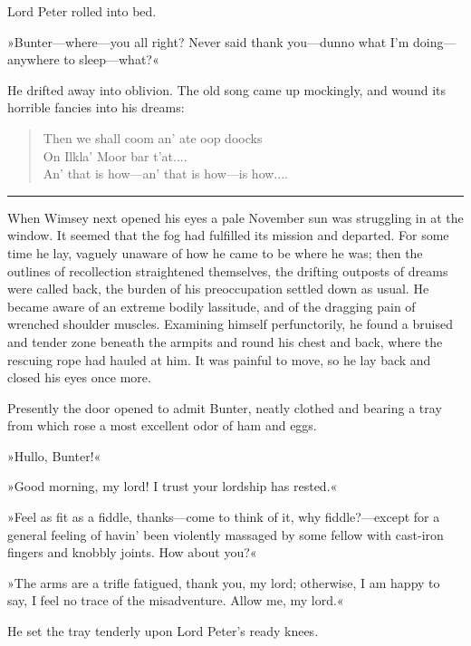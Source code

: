  Lord Peter rolled into bed.

»Bunter\allowbreak---\allowbreak where---you all right? Never said thank you\allowbreak---\allowbreak dunno what I'm doing\allowbreak---\allowbreak anywhere to sleep\allowbreak---\allowbreak what?«

He drifted away into oblivion. The old song came up mockingly, and wound its horrible fancies into his dreams: 

\begin{verse}
\begin{altverse}
Then we shall coom an' ate oop doocks\\
On Ilkla' Moor bar t'at....\\
An' that is how—an' that is how—is how....\\
\end{altverse}
\end{verse}

\noindent\hfil\rule{0.5\textwidth}{.4pt}\hfil 

When Wimsey next opened his eyes a pale November sun was struggling in at the window. It seemed that the fog had fulfilled its mission and departed. For some time he lay, vaguely unaware of how he came to be where he was; then the outlines of recollection straightened themselves, the drifting outposts of dreams were called back, the burden of his preoccupation settled down as usual. He became aware of an extreme bodily lassitude, and of the dragging pain of wrenched shoulder muscles. Examining himself perfunctorily, he found a bruised and tender zone beneath the armpits and round his chest and back, where the rescuing rope had hauled at him. It was painful to move, so he lay back and closed his eyes once more.

Presently the door opened to admit Bunter, neatly clothed and bearing a tray from which rose a most excellent odor of ham and eggs.

»Hullo, Bunter!«

»Good morning, my lord! I trust your lordship has rested.«

»Feel as fit as a fiddle, thanks\allowbreak---\allowbreak come to think of it, why fiddle?---except for a general feeling of havin' been violently massaged by some fellow with cast-iron fingers and knobbly joints. How about you?«

»The arms are a trifle fatigued, thank you, my lord; otherwise, I am happy to say, I feel no trace of the misadventure. Allow me, my lord.«

He set the tray tenderly upon Lord Peter's ready knees.


